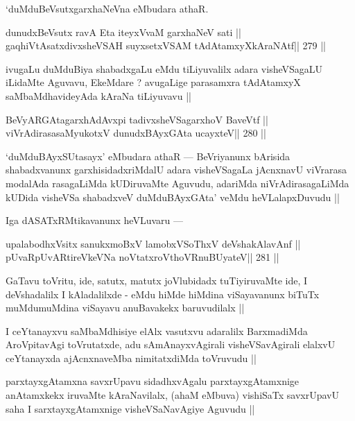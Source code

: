 \begin{artha}
`duMduBeVsutxgarxhaNeVna eMbudara athaR.
\end{artha}

\begin{shl}
dunudxBeVsutx ravA Eta iteyxVvaM garxhaNeV sati ||
gaqhiVtAsatxdivxsheVSAH suyxsetxVSAM tAdAtamxyXkAraNAtf\hfill || 279 ||
\end{shl}

\begin{artha}
ivugaLu duMduBiya shabadxgaLu eMdu tiLiyuvalilx adara visheVSagaLU iLidaMte Aguvavu, EkeMdare ? avugaLige parasamxra tAdAtamxyX saMbaMdhavideyAda kAraNa tiLiyuvavu ||
\end{artha}

\begin{shl}
BeVyARGAtagarxhAdAvx\s pi tadivxsheVSagarxhoV BaveVtf ||
viVrAdirasasaMyukotxV dunudxBAyxGAta ucayxteV\hfill || 280 ||
\end{shl}

\begin{artha}
`duMduBAyxSUtasayx' eMbudara athaR --- BeVriyanunx bArisida shabadxvanunx garxhisidadxriMdalU adara visheVSagaLa jAcnxnavU viVrarasa modalAda rasagaLiMda kUDiruvaMte Aguvudu, adariMda niVrAdirasagaLiMda kUDida visheVSa shabadxveV duMduBAyxGAta' veMdu heVLalapxDuvudu ||
\end{artha}

\begin{artha}
Iga dASATxRMtikavanunx heVLuvaru ---
\end{artha}

\begin{shl}
upalabodhxV\s sitx sanukxmoBxV lamobxVSoThxV deVshakAlavAnf ||
pUvaRpUvARtireVkeVNa noVtatxroV\s thoVR\s nuBUyateV\hfill || 281 ||
\end{shl}

\begin{artha}
GaTavu toVritu, ide, satutx, matutx joVlubidadx tuTiyiruvaMte ide, I deVshadalilx I kAladalilxde - eMdu hiMde hiMdina viSayavanunx biTuTx muMdumuMdina viSayavu anuBavakekx baruvudilalx ||
\end{artha}

\begin{artha}
I ceYtanayxvu saMbaMdhisiye elAlx vasutxvu adaralilx BarxmadiMda AroVpitavAgi toVrutatxde, adu sAmAnayxvAgirali visheVSavAgirali elalxvU ceYtanayxda ajAcnxnaveMba nimitatxdiMda toVruvudu ||
\end{artha}

\begin{artha}
parxtayxgAtamxna savxrUpavu sidadhxvAgalu parxtayxgAtamxnige anAtamxkekx iruvaMte kAraNavilalx, (ahaM eMbuva) vishiSaTx savxrUpavU saha I sarxtayxgAtamxnige visheVSaNavAgiye Aguvudu ||
\end{artha}

